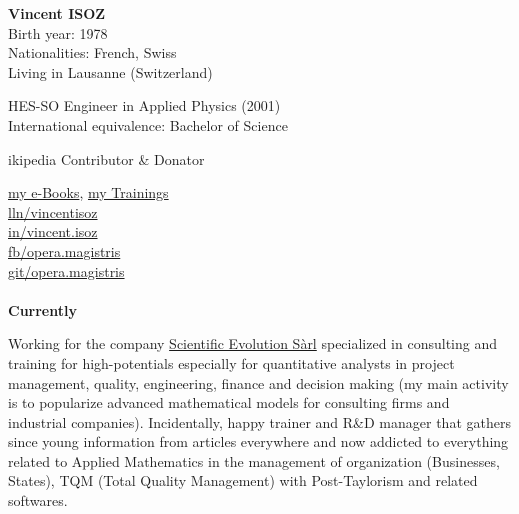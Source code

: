 	\pichskip{15pt}%
	\textbf{Vincent ISOZ}\\
	Birth year: 1978\\
	Nationalities: French, Swiss\\
	Living in Lausanne (Switzerland)
	
	HES-SO Engineer in Applied Physics (2001)\\
	International equivalence: Bachelor of Science

	\faWikipediaW ikipedia Contributor \& Donator
	
	\href{https://fr.scribd.com/collections/3709887/My-e-books}{{\color{blue} my e-Books}}, \href{https://www.video2brain.com/fr/formateur/vincent-isoz/}{{\color{blue} my Trainings}}
	\\
	\href{https://www.linkedin.com/in/vincentisoz}{\faLinkedinSquare{}lln/vincentisoz}\\
	\href{https://www.instagram.com/vincent.isoz/}{\faInstagram{}in/vincent.isoz}
	\\
	\href{https://www.facebook.com/groups/1793543747588689/}{\faFacebook{}fb/opera.magistris}\\
	\href{https://github.com/vincentisoz/opera_magistris/}{\faGithub{}git/opera.magistris}\\\\
	
	\textbf{Currently}
	
	Working for the company \href{http://www.scientific-evolution.com}{{\color{blue} Scientific Evolution Sàrl}} specialized in consulting and training for high-potentials especially for quantitative analysts in project management, quality, engineering, finance and decision making (my main activity is to popularize advanced mathematical models for consulting firms and industrial companies). Incidentally, happy trainer and R\&D manager that gathers since young information from articles everywhere and now addicted to everything related to Applied Mathematics in the management of organization (Businesses, States), TQM (Total Quality Management) with Post-Taylorism and related softwares.
	
